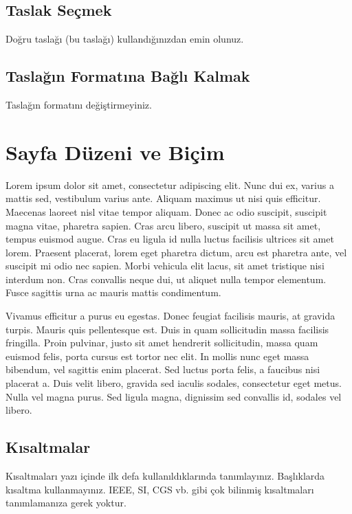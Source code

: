 \documentclass[conference]{IEEEtran}
\begin{document}
\subsection{Taslak Seçmek}

Doğru taslağı (bu taslağı) kullandığınızdan emin olunuz.\cite{van2007experimental}

\subsection{Taslağın Formatına Bağlı Kalmak}

Taslağın formatını değiştirmeyiniz. \cite{guo2004learning}


\section{Sayfa Düzeni ve Biçim}

Lorem ipsum dolor sit amet, consectetur adipiscing elit. Nunc dui ex, varius a mattis sed, vestibulum varius ante. Aliquam maximus ut nisi quis efficitur. Maecenas laoreet nisl vitae tempor aliquam. Donec ac odio suscipit, suscipit magna vitae, pharetra sapien. Cras arcu libero, suscipit ut massa sit amet, tempus euismod augue. Cras eu ligula id nulla luctus facilisis ultrices sit amet lorem. Praesent placerat, lorem eget pharetra dictum, arcu est pharetra ante, vel suscipit mi odio nec sapien. Morbi vehicula elit lacus, sit amet tristique nisi interdum non. Cras convallis neque dui, ut aliquet nulla tempor elementum. Fusce sagittis urna ac mauris mattis condimentum.\cite{knauff2014efficiency}

Vivamus efficitur a purus eu egestas. Donec feugiat facilisis mauris, at gravida turpis. Mauris quis pellentesque est. Duis in quam sollicitudin massa facilisis fringilla. Proin pulvinar, justo sit amet hendrerit sollicitudin, massa quam euismod felis, porta cursus est tortor nec elit. In mollis nunc eget massa bibendum, vel sagittis enim placerat. Sed luctus porta felis, a faucibus nisi placerat a. Duis velit libero, gravida sed iaculis sodales, consectetur eget metus. Nulla vel magna purus. Sed ligula magna, dignissim sed convallis id, sodales vel libero.

\subsection{Kısaltmalar}

Kısaltmaları yazı içinde ilk defa kullanıldıklarında tanımlayınız. Başlıklarda kısaltma kullanmayınız. IEEE, SI, CGS vb. gibi çok bilinmiş kısaltmaları tanımlamanıza gerek yoktur.
\end{document}
